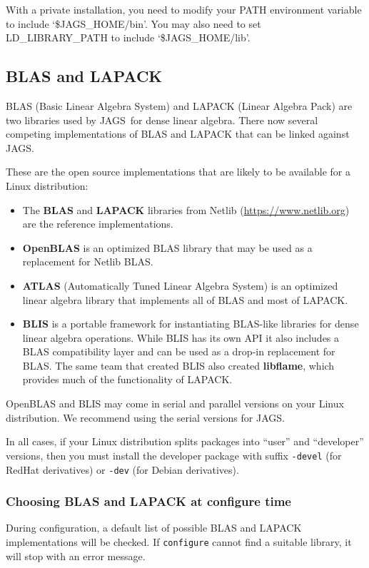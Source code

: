 \documentclass[11pt, a4paper, titlepage]{article}
\newcommand{\JAGS}{\textsf{JAGS}}
\newcommand{\code}[1]{{\bgroup{\normalfont\ttfamily #1}\egroup}}
\newcommand{\file}[1]{{`\normalfont\textsf{#1}'}}
\begin{document}
With a private installation, you need to modify your PATH environment
variable to include \file{\$JAGS\_HOME/bin}. You may also need to set
\code{LD\_LIBRARY\_PATH} to include \file{\$JAGS\_HOME/lib}.

\subsection{BLAS and LAPACK}
\label{section:blas:lapack}

BLAS (Basic Linear Algebra System) and LAPACK (Linear Algebra Pack)
are two libraries used by \JAGS\ for dense linear algebra.  There now
several competing implementations of BLAS and LAPACK that can be
linked against \JAGS.

These are the open source implementations that are likely to be available
for a Linux distribution:
\begin{itemize}
\item The {\bf BLAS} and {\bf LAPACK} libraries from Netlib
  (\url{https://www.netlib.org}) are the reference implementations.
\item {\bf OpenBLAS} is an optimized BLAS library that may be used as
  a replacement for Netlib BLAS.
\item {\bf ATLAS} (Automatically Tuned Linear Algebra System) is an
  optimized linear algebra library that implements all of BLAS and
  most of LAPACK.
\item {\bf BLIS} is a portable framework for instantiating BLAS-like
  libraries for dense linear algebra operations. While BLIS has its
  own API it also includes a BLAS compatibility layer and can be used
  as a drop-in replacement for BLAS. The same team that created BLIS
  also created {\bf libflame}, which provides much of the
  functionality of LAPACK.
\end{itemize}
OpenBLAS and BLIS may come in serial and parallel versions on your
Linux distribution. We recommend using the serial versions for \JAGS.

In all cases, if your Linux distribution splits packages into ``user''
and ``developer'' versions, then you must install the developer
package with suffix \texttt{-devel} (for RedHat derivatives) or
\texttt{-dev} (for Debian derivatives).

\subsubsection{Choosing BLAS and LAPACK at configure time}

During configuration, a default list of possible BLAS and LAPACK
implementations will be checked. If \texttt{configure} cannot find a
suitable library, it will stop with an error message.
\end{document}
